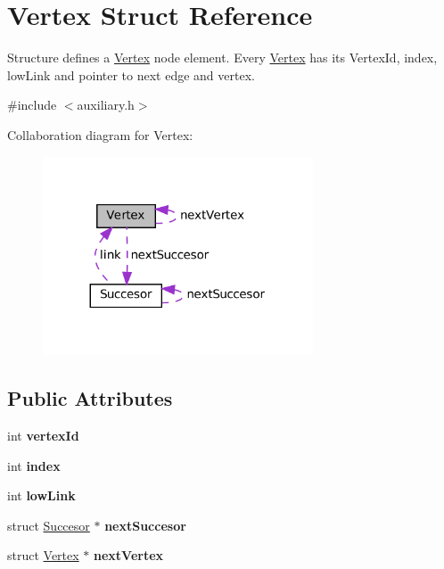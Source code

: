 \hypertarget{structVertex}{}\section{Vertex Struct Reference}
\label{structVertex}


Structure defines a \hyperlink{structVertex}{Vertex} node element. Every \hyperlink{structVertex}{Vertex} has its Vertex\+Id, index, low\+Link and pointer to next edge and vertex.  




{\ttfamily \#include $<$auxiliary.\+h$>$}



Collaboration diagram for Vertex\+:\nopagebreak
\begin{figure}[H]
\begin{center}
\leavevmode
\includegraphics[width=227pt]{structVertex__coll__graph}
\end{center}
\end{figure}
\subsection*{Public Attributes}
\begin{DoxyCompactItemize}
\item 
\mbox{\label{structVertex_a0bd9b55e3d918b99c85bb8559a216bf6}} 
int {\bfseries vertex\+Id}
\item 
\mbox{\label{structVertex_a2e35f7521dfd3fdee65dc26879c62f24}} 
int {\bfseries index}
\item 
\mbox{\label{structVertex_a8874ba5bd4bfa964b36611ef6584d3fb}} 
int {\bfseries low\+Link}
\item 
\mbox{\label{structVertex_a849f42b274d0a855ff93c30682789bb6}} 
struct \hyperlink{structSuccesor}{Succesor} $\ast$ {\bfseries next\+Succesor}
\item 
\mbox{\label{structVertex_abfd146c35ca902d2fe8341a42b8f1301}} 
struct \hyperlink{structVertex}{Vertex} $\ast$ {\bfseries next\+Vertex}
\end{DoxyCompactItemize}


